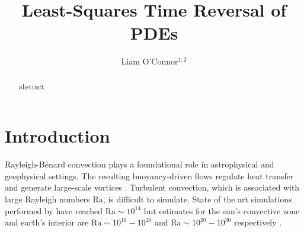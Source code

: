 \documentclass[longbibliography,amsmath,amssymb,aps,nofootinbib]{revtex4-2}
\newcommand\Ra{\mathrm{Ra}}
\renewcommand{\vec}[1]{\boldsymbol{#1}}
\newcommand{\grad}{\vec{\nabla}}
\begin{document}
\title{Least-Squares Time Reversal of PDEs}

\author{Liam O'Connor$^{1,2}$}

\begin{abstract}
    abstract
\end{abstract}

\maketitle

\section{Introduction}
Rayleigh-B\'enard convection plays a foundational role in astrophysical and geophysical settings.
The resulting buoyancy-driven flows regulate heat transfer and generate large-scale vortices \cite{Couston}.
Turbulent convection, which is associated with large Rayleigh numbers $\Ra$, is difficult to simulate. 
State of the art simulations performed by \cite{Zhu_2018} have reached $\Ra \sim 10^{14}$ but estimates for the sun's convective zone and earth's interior are $\Ra \sim 10^{16}-10^{20}$ and $\Ra \sim 10^{20}-10^{30}$ respectively \cite{Ossendrijver,Gubbins_2001}. 





\end{document}
